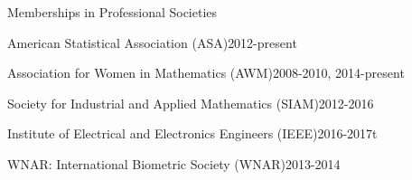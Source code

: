 \documentclass{resume} %
\begin{document}
\begin{rSection}{Memberships in Professional Societies}
\begin{esSubsection}{American Statistical Association }{(ASA)}{2012-present}{}{}
\end{esSubsection}

\begin{esSubsection}{Association for Women in Mathematics }{(AWM)}{2008-2010, 2014-present}{}{}
\end{esSubsection}

\begin{esSubsection}{Society for Industrial and Applied Mathematics }{(SIAM)}{2012-2016}{}{}
\end{esSubsection}


\begin{esSubsection}{Institute of Electrical and Electronics Engineers }{(IEEE)}{2016-2017t}{}{}
\end{esSubsection}

\begin{esSubsection}{WNAR: International Biometric Society }{(WNAR)}{2013-2014}{}{}
\end{esSubsection}


\end{rSection}



\clearpage
\end{document}
